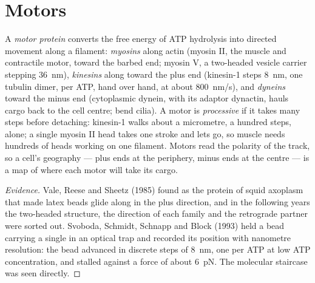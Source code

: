 \section{Motors}

\begin{definition}\label{def:b3:cytoskeleton-motility:motors}
A \emph{motor protein} converts the free energy of ATP hydrolysis into
directed movement along a filament: \emph{myosins} along actin (myosin
II, the muscle and contractile motor, toward the barbed end; myosin V,
a two-headed vesicle carrier stepping \qty{36}{nm}), \emph{kinesins}
along  toward the plus end (kinesin-1 steps \qty{8}{nm},
one tubulin dimer, per ATP, hand over hand, at about \qty{800}{nm/s}),
and \emph{dyneins} toward the minus end (cytoplasmic dynein, with its
adaptor dynactin, hauls cargo back to the cell centre; 
bend cilia). A motor is \emph{processive} if it takes many steps before
detaching: kinesin-1 walks about a micrometre, a hundred steps, alone;
a single myosin II head takes one stroke and lets go, so muscle needs
hundreds of heads working on one filament. Motors read the polarity of
the track, so a cell's geography --- plus ends at the periphery, minus
ends at the centre --- is a map of where each motor will take its
cargo.
\end{definition}

\begin{proof}[Evidence]
Vale, Reese and Sheetz (1985) found  as the protein of squid
axoplasm that made latex beads glide along  in the plus
direction, and in the following years the two-headed structure, the
direction of each family and the retrograde partner  were sorted
out. Svoboda, Schmidt, Schnapp and Block (1993) held a bead carrying a
single  in an optical trap and recorded its position with
nanometre resolution: the bead advanced in discrete steps of
\qty{8}{nm}, one per ATP at low ATP concentration, and stalled against
a force of about \qty{6}{pN}. The molecular staircase was seen
directly.
\end{proof}

